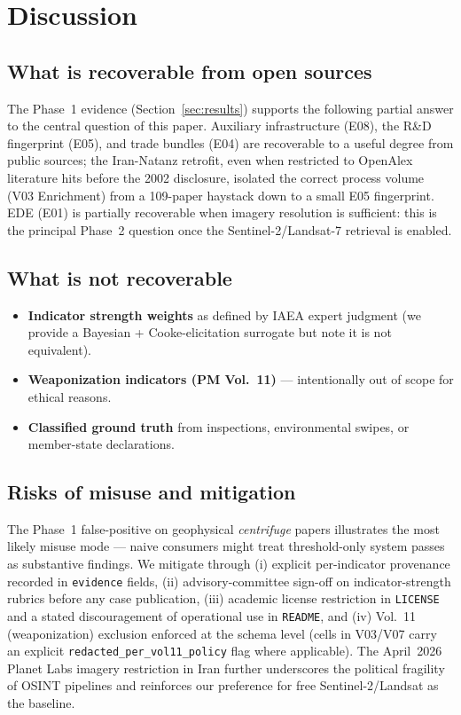 \documentclass[11pt,a4paper]{article}
\begin{document}
\section{Discussion}\label{sec:disc}

\subsection{What is recoverable from open sources}
The Phase~1 evidence (Section~\ref{sec:results}) supports the
following partial answer to the central question of this paper.
Auxiliary infrastructure (E08), the R\&D fingerprint (E05), and trade
bundles (E04) are recoverable to a useful degree from public sources;
the Iran-Natanz retrofit, even when restricted to OpenAlex literature
hits before the 2002 disclosure, isolated the correct process volume
(V03 Enrichment) from a 109-paper haystack down to a small E05
fingerprint. EDE (E01) is partially recoverable when imagery resolution
is sufficient: this is the principal Phase~2 question once the
Sentinel-2/Landsat-7 retrieval is enabled.

\subsection{What is not recoverable}\label{sec:limits}
\begin{itemize}[leftmargin=*,itemsep=2pt]
  \item \textbf{Indicator strength weights} as defined by IAEA expert
        judgment (we provide a Bayesian + Cooke-elicitation surrogate
        but note it is not equivalent).
  \item \textbf{Weaponization indicators (PM Vol.~11)} --- intentionally
        out of scope for ethical reasons.
  \item \textbf{Classified ground truth} from inspections, environmental
        swipes, or member-state declarations.
\end{itemize}

\subsection{Risks of misuse and mitigation}
The Phase~1 false-positive on geophysical \emph{centrifuge} papers
illustrates the most likely misuse mode --- naive consumers might
treat threshold-only system passes as substantive findings. We mitigate
through (i) explicit per-indicator provenance recorded in
\texttt{evidence} fields, (ii) advisory-committee sign-off on
indicator-strength rubrics before any case publication, (iii) academic
license restriction in \texttt{LICENSE} and a stated discouragement of
operational use in \texttt{README}, and (iv) Vol.~11 (weaponization)
exclusion enforced at the schema level (cells in V03/V07 carry an
explicit \texttt{redacted\_per\_vol11\_policy} flag where applicable).
The April~2026 Planet Labs imagery restriction in Iran further
underscores the political fragility of OSINT pipelines and reinforces
our preference for free Sentinel-2/Landsat as the baseline.
\end{document}
